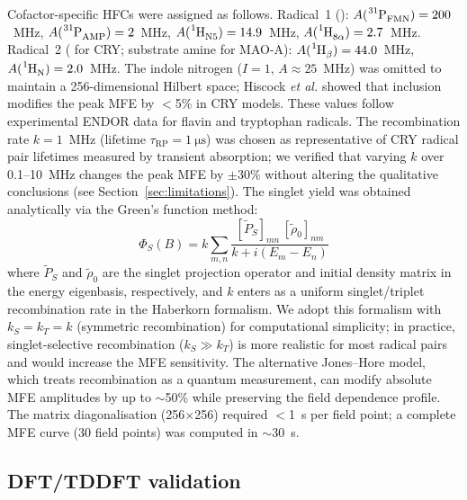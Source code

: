 \documentclass[twoside,twocolumn,9pt]{article}
\begin{document}
Cofactor-specific HFCs were assigned as follows. Radical~1 (): $A(\ce{^{31}P_{FMN}}) = 200$~MHz,\cite{Weber1998} $A(\ce{^{31}P_{AMP}}) = 2$~MHz, $A(\ce{^{1}H_{N5}}) = 14.9$~MHz, $A(\ce{^{1}H_{8\alpha}}) = 2.7$~MHz. Radical~2 ( for CRY; substrate amine for MAO-A): $A(\ce{^{1}H_{\beta}}) = 44.0$~MHz, $A(\ce{^{1}H_{N}}) = 2.0$~MHz. The  indole nitrogen ($I = 1$, $A \approx 25$~MHz) was omitted to maintain a 256-dimensional Hilbert space; Hiscock \textit{et al.}\cite{Hiscock2016} showed that  inclusion modifies the peak MFE by $<$5\% in CRY models. These values follow experimental ENDOR data for flavin\cite{Weber1998} and tryptophan\cite{Hiscock2016} radicals. The recombination rate $k = 1$~MHz (lifetime $\tau_\mathrm{RP} = 1~\si{\micro\second}$) was chosen as representative of CRY radical pair lifetimes measured by transient absorption;\cite{Maeda2012} we verified that varying $k$ over 0.1--10~MHz changes the peak MFE by $\pm$30\% without altering the qualitative conclusions (see Section~\ref{sec:limitations}). The singlet yield was obtained analytically via the Green's function method:\cite{Haberkorn1976}
\begin{equation}
\Phi_S(B) = k\sum_{m,n} \frac{[\tilde{P}_S]_{mn}\,[\tilde{\rho}_0]_{nm}}{k + i(E_m - E_n)}
\label{eq:PhiS}
\end{equation}
where $\tilde{P}_S$ and $\tilde{\rho}_0$ are the singlet projection operator and initial density matrix in the energy eigenbasis, respectively, and $k$ enters as a uniform singlet/triplet recombination rate in the Haberkorn formalism.\cite{Haberkorn1976} We adopt this formalism with $k_S = k_T = k$ (symmetric recombination) for computational simplicity; in practice, singlet-selective recombination ($k_S \gg k_T$) is more realistic for most radical pairs and would increase the MFE sensitivity.\cite{Haberkorn1976} The alternative Jones--Hore model, which treats recombination as a quantum measurement, can modify absolute MFE amplitudes by up to $\sim$50\% while preserving the field dependence profile.\cite{Jones2009} The matrix diagonalisation (256$\times$256) required $<$1~s per field point; a complete MFE curve (30 field points) was computed in $\sim$30~s.

\subsection{DFT/TDDFT validation}
\end{document}
